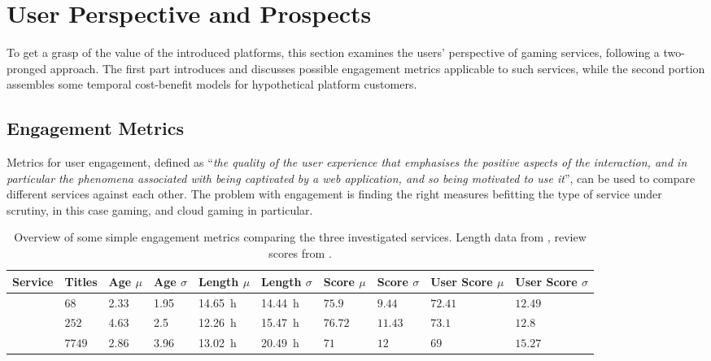 \section{User Perspective and Prospects}
\label{sec:engagement}

To get a grasp of the value of the introduced platforms, this section examines the users' perspective of gaming services, following a two-pronged approach. The first part introduces and discusses possible engagement metrics applicable to such services, while the second portion assembles some temporal cost-benefit models for hypothetical platform customers.


\subsection{Engagement Metrics}

Metrics for user engagement, defined as ``\textit{the quality of the user experience that emphasises the positive aspects of the interaction, and in particular the phenomena associated with being captivated by a web application, and so being motivated to use it}''\cite{Lehmann2012}, can be used to compare different services against each other. The problem with engagement is finding the right measures befitting the type of service under scrutiny, in this case gaming, and cloud gaming in particular.

\begin{table}
\centering
\caption{Overview of some simple engagement metrics comparing the three investigated services. Length data from \hltb, review scores from \metacritic.}
\label{tab:basic-engagement}
	\begin{tabu}{X[2]|X[r]X[r]X[r]X[r]X[r]X[r]X[r]X[r]X[r]}
	\toprule
	Service & Titles & Age $\mu$ & Age $\sigma$ & Length $\mu$ & Length $\sigma$ & Score $\mu$ & Score $\sigma$ & User Score $\mu$ & User Score $\sigma$\\
	\midrule
	\gfnow & $68$ & \SI{2.33}{\year} & \SI{1.95}{\year} & \SI{14.65}{\hour} & \SI{14.44}{\hour} & $75.9$ & $9.44$ & $72.41$ & $12.49$\\
	\psnow & $252$ & \SI{4.63}{\year} & \SI{2.5}{\year} & \SI{12.26}{\hour} & \SI{15.47}{\hour} & $76.72$ & $11.43$ & $73.1$ & $12.8$\\
	\steam & $7749$ & \SI{2.86}{\year} & \SI{3.96}{\year} & \SI{13.02}{\hour} & \SI{20.49}{\hour} & $71$ & $12$ & $69$ & $15.27$\\
	\bottomrule
	\end{tabu}
\end{table}

